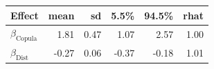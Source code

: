 
\begin{tabular}[t]{lrrrrr}
\toprule
Effect & mean & sd & 5.5\% & 94.5\% & rhat\\
\midrule
$\beta_{\text{Copula}}$ & 1.81 & 0.47 & 1.07 & 2.57 & 1.00\\
$\beta_{\text{Dist}}$ & -0.27 & 0.06 & -0.37 & -0.18 & 1.01\\
\bottomrule
\end{tabular}
